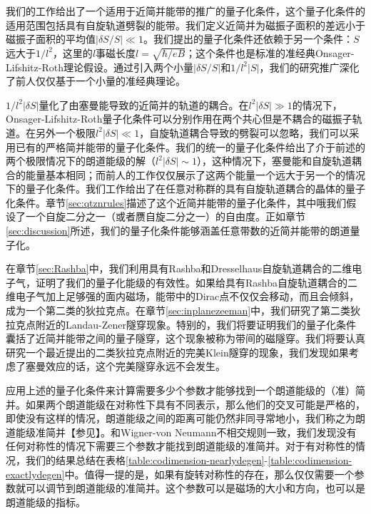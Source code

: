 我们的工作给出了一个适用于近简并能带的推广的量子化条件，这个量子化条件的适用范围包括具有自旋轨道劈裂的能带。我们定义近简并为磁振子面积的差远小于磁振子面积的平均值$|\delta S/S|{\ll}1$。我们提出的量子化条件还依赖于另一个条件：$S$远大于$1/l^2$，这里的$l$事磁长度$l{=}\sqrt{\hbar/eB}$；这个条件也是标准的准经典Onsager-Lifshitz-Roth理论假设。通过引入两个小量$|\delta S/S|$和$1/l^2|S|$，我们的研究推广深化了前人仅仅基于一个小量的准经典理论\cite{kohn_effham,blount_effham,rotheffham,wannier_fredkin,fischbeck_review,Mikitik_quantizationrule,topoferm,100p,gao_zero-field_2017}。

$1/l^2|\delta S|$量化了由塞曼能导致的近简并的轨道的耦合。在$l^2|\delta S|{\gg}1$的情况下，Onsager-Lifshitz{-Roth}量子化条件可以分别作用在两个共心但是不耦合的磁振子轨道。在另外一个极限$l^2|\delta S|{\ll}1$，自旋轨道耦合导致的劈裂可以忽略，我们可以采用已有的严格简并能带的量子化条件\cite{rotheffham,rothmag,topoferm,100p,Mikitik_quantizationrule}。我们的统一的量子化条件给出了介于前述的两个极限情况下的朗道能级的解（$l^2|\delta S|{\sim}1$），这种情况下，塞曼能和自旋轨道耦合的能量基本相同；而前人的工作仅仅展示了这两个能量一个远大于另一个的情况下的量子化条件。我们工作给出了在任意对称群的具有自旋轨道耦合的晶体的量子化条件。章节\ref{sec:qtznrules}描述了这个近简并能带的量子化条件，其中哦我们假设了一个自旋二分之一（或者赝自旋二分之一）的自由度。正如章节\ref{sec:discussion}所述，我们的量子化条件能够涵盖任意带数的近简并能带的朗道量子化。


在章节\ref{sec:Rashba}中，我们利用具有Rashba和Dresselhaus自旋轨道耦合的二维电子气，证明了我们的量子化能级的有效性。如果给具有Rashba自旋轨道耦合的二维电子气加上足够强的面内磁场，能带中的Dirac点不仅仅会移动，而且会倾斜，成为一个第二类的狄拉克点\cite{soluyanov_type-ii_2015, muechler_tilted_2016, bergholtz_topology_2015}。在章节\ref{sec:inplanezeeman}中，我们研究了第二类狄拉克点附近的Landau-Zener隧穿现象。特别的，我们将要证明我们的量子化条件囊括了近简并能带之间的量子隧穿，这个现象被称为带间的磁隧穿\cite{kaganov_coherent_1983,slutskin_dynamics_1968,AALG,100p}。我们将要认真研究一个最近提出的二类狄拉克点附近的完美Klein隧穿的现象\cite{obrien_magnetic_2016}，我们发现如果考虑了塞曼效应的话，这个完美隧穿永远不会发生。

应用上述的量子化条件来计算需要多少个参数才能够找到一个朗道能级的（准）简并。如果两个朗道能级在对称性下具有不同表示，那么他们的交叉可能是严格的，即使没有这样的情况，朗道能级之间的距离可能仍然非同寻常地小，我们称之为朗道能级准简并【参见】。和Wigner-von Neumann不相交规则\cite{neumann2000behaviour}一致，我们发现没有任何对称性的情况下需要三个参数才能找到朗道能级的准简并。对于有对称性的情况，我们的结果总结在表格\ref{table:codimension-nearlydegen}-\ref{table:codimension-exactlydegen}中。值得一提的是，如果有旋转对称性的存在，那么仅仅需要一个参数就可以调节到朗道能级的准简并。这个参数可以是磁场的大小和方向，也可以是朗道能级的指标。

